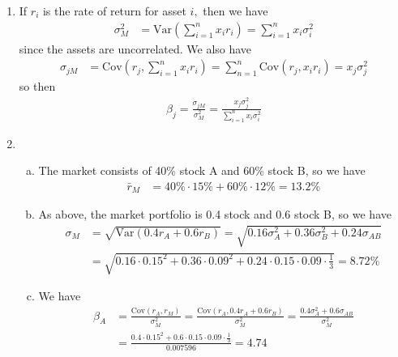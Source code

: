 \documentclass{article}
\newcommand{\var}{\mathrm{Var}}
\newcommand{\cov}{\mathrm{Cov}}
\begin{document}
\begin{enumerate}
\begin{enumerate}[(a)]
		\end{enumerate}

	\item 
		\begin{soln}
			If $r_i$ is the rate of return for asset $i,$ then we have
			\begin{align*}
				\sigma_M^2 &= \var\left( \sum_{i=1}^{n} x_ir_i \right) = \sum_{i=1}^{n} x_i\sigma_i^2
			\end{align*}
			since the assets are uncorrelated. We also have
			\begin{align*}
				\sigma_{jM} &= \cov\left( r_j, \sum_{i=1}^{n} x_i r_i \right) = \sum_{n=1}^{n} \cov(r_j, x_i r_i) = x_j\sigma_j^2
			\end{align*}
			so then 
			\begin{align*}
				\beta_j = \frac{\sigma_{jM}}{\sigma_M^2} = \frac{x_j\sigma_j^2}{\sum_{i=1}^{n} x_i\sigma_i^2}
			\end{align*}
		\end{soln}

	\item 
		\begin{enumerate}[(a)]
			\item 
				\begin{soln}
					The market consists of 40\% stock A and 60\% stock B, so we have
					\begin{align*}
						\bar r_M &= 40\%\cdot 15\% + 60\%\cdot 12\% = 13.2\%
					\end{align*}
				\end{soln}

			\item 
				\begin{soln}
					As above, the market portfolio is 0.4 stock and 0.6 stock B, so we have
					\begin{align*}
						\sigma_M &= \sqrt{\var(0.4r_A + 0.6r_B)} = \sqrt{0.16\sigma_A^2 + 0.36\sigma_B^2 + 0.24\sigma_{AB}} \\
						&= \sqrt{0.16\cdot 0.15^2 + 0.36\cdot 0.09^2 + 0.24\cdot 0.15\cdot 0.09\cdot \frac{1}{3}} = 8.72\%
					\end{align*}
				\end{soln}

			\item 
				\begin{soln}
					We have
					\begin{align*}
						\beta_A &= \frac{\cov(r_A, r_M)}{\sigma_M^2} = \frac{\cov(r_A, 0.4r_A + 0.6r_B)}{\sigma_M^2} = \frac{0.4\sigma_A^2 + 0.6\sigma_{AB}}{\sigma_M^2} \\
						&= \frac{0.4\cdot 0.15^2 + 0.6\cdot 0.15\cdot 0.09\cdot \frac{1}{3}}{0.007596} = 4.74
					\end{align*}
				\end{soln}


\end{enumerate}
\end{enumerate}
\end{document}
